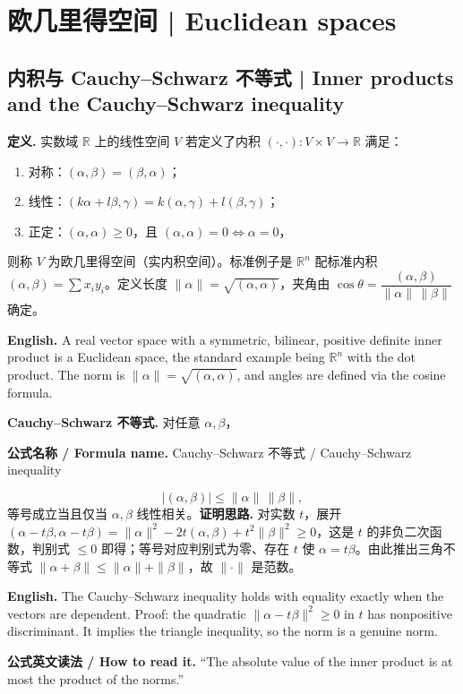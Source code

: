 \documentclass[UTF8,11pt,a4paper]{ctexart}
\newcommand{\EN}[1]{\par\noindent\textbf{English.} #1\par}
\newcommand{\READ}[1]{\par\noindent\textbf{公式英文读法 / How to read it.} #1\par}
\newcommand{\FORMULA}[2]{\par\noindent\textbf{公式名称 / Formula name.} #1 / #2\par}
\begin{document}
\section{欧几里得空间 | Euclidean spaces}
\subsection{内积与 Cauchy--Schwarz 不等式 | Inner products and the Cauchy--Schwarz inequality}
\noindent\textbf{定义.} 实数域 $\mathbb R$ 上的线性空间 $V$ 若定义了内积 $(\cdot,\cdot):V\times V\to\mathbb R$ 满足：
\begin{enumerate}[label=(\arabic*),leftmargin=2.4em,itemsep=1pt]
\item 对称：$(\alpha,\beta)=(\beta,\alpha)$；
\item 线性：$(k\alpha+l\beta,\gamma)=k(\alpha,\gamma)+l(\beta,\gamma)$；
\item 正定：$(\alpha,\alpha)\ge0$，且 $(\alpha,\alpha)=0\iff\alpha=0$，
\end{enumerate}
则称 $V$ 为欧几里得空间（实内积空间）。标准例子是 $\mathbb R^n$ 配标准内积 $(\alpha,\beta)=\sum x_iy_i$。定义长度 $\|\alpha\|=\sqrt{(\alpha,\alpha)}$，夹角由 $\cos\theta=\dfrac{(\alpha,\beta)}{\|\alpha\|\,\|\beta\|}$ 确定。
\EN{A real vector space with a symmetric, bilinear, positive definite inner product is a Euclidean space, the standard example being $\mathbb R^n$ with the dot product. The norm is $\|\alpha\|=\sqrt{(\alpha,\alpha)}$, and angles are defined via the cosine formula.}
\noindent\textbf{Cauchy--Schwarz 不等式.} 对任意 $\alpha,\beta$，
\FORMULA{Cauchy--Schwarz 不等式}{Cauchy--Schwarz inequality}
\[
|(\alpha,\beta)|\le\|\alpha\|\,\|\beta\|,
\]
等号成立当且仅当 $\alpha,\beta$ 线性相关。\noindent\textbf{证明思路.} 对实数 $t$，展开 $(\alpha-t\beta,\alpha-t\beta)=\|\alpha\|^2-2t(\alpha,\beta)+t^2\|\beta\|^2\ge0$，这是 $t$ 的非负二次函数，判别式 $\le0$ 即得；等号对应判别式为零、存在 $t$ 使 $\alpha=t\beta$。由此推出三角不等式 $\|\alpha+\beta\|\le\|\alpha\|+\|\beta\|$，故 $\|\cdot\|$ 是范数。
\EN{The Cauchy--Schwarz inequality holds with equality exactly when the vectors are dependent. Proof: the quadratic $\|\alpha-t\beta\|^2\ge0$ in $t$ has nonpositive discriminant. It implies the triangle inequality, so the norm is a genuine norm.}
\READ{``The absolute value of the inner product is at most the product of the norms.''}
\end{document}
